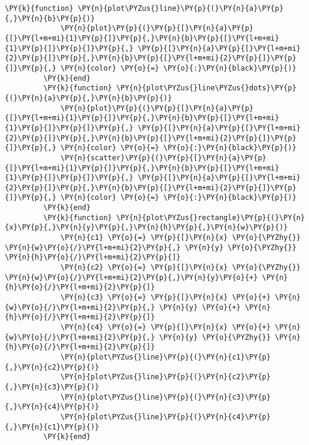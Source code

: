 \begin{Verbatim}[commandchars=\\\{\}]
         \PY{k}{function} \PY{n}{plot\PYZus{}line}\PY{p}{(}\PY{n}{a}\PY{p}{,}\PY{n}{b}\PY{p}{)}
             \PY{n}{plot}\PY{p}{(}\PY{p}{[}\PY{n}{a}\PY{p}{[}\PY{l+m+mi}{1}\PY{p}{]}\PY{p}{,}\PY{n}{b}\PY{p}{[}\PY{l+m+mi}{1}\PY{p}{]}\PY{p}{]}\PY{p}{,} \PY{p}{[}\PY{n}{a}\PY{p}{[}\PY{l+m+mi}{2}\PY{p}{]}\PY{p}{,}\PY{n}{b}\PY{p}{[}\PY{l+m+mi}{2}\PY{p}{]}\PY{p}{]}\PY{p}{,} \PY{n}{color} \PY{o}{=} \PY{o}{:}\PY{n}{black}\PY{p}{)}
         \PY{k}{end}
         \PY{k}{function} \PY{n}{plot\PYZus{}line\PYZus{}dots}\PY{p}{(}\PY{n}{a}\PY{p}{,}\PY{n}{b}\PY{p}{)}
             \PY{n}{plot}\PY{p}{(}\PY{p}{[}\PY{n}{a}\PY{p}{[}\PY{l+m+mi}{1}\PY{p}{]}\PY{p}{,}\PY{n}{b}\PY{p}{[}\PY{l+m+mi}{1}\PY{p}{]}\PY{p}{]}\PY{p}{,} \PY{p}{[}\PY{n}{a}\PY{p}{[}\PY{l+m+mi}{2}\PY{p}{]}\PY{p}{,}\PY{n}{b}\PY{p}{[}\PY{l+m+mi}{2}\PY{p}{]}\PY{p}{]}\PY{p}{,} \PY{n}{color} \PY{o}{=} \PY{o}{:}\PY{n}{black}\PY{p}{)}
             \PY{n}{scatter}\PY{p}{(}\PY{p}{[}\PY{n}{a}\PY{p}{[}\PY{l+m+mi}{1}\PY{p}{]}\PY{p}{,}\PY{n}{b}\PY{p}{[}\PY{l+m+mi}{1}\PY{p}{]}\PY{p}{]}\PY{p}{,} \PY{p}{[}\PY{n}{a}\PY{p}{[}\PY{l+m+mi}{2}\PY{p}{]}\PY{p}{,}\PY{n}{b}\PY{p}{[}\PY{l+m+mi}{2}\PY{p}{]}\PY{p}{]}\PY{p}{,} \PY{n}{color} \PY{o}{=} \PY{o}{:}\PY{n}{black}\PY{p}{)}
         \PY{k}{end}
         \PY{k}{function} \PY{n}{plot\PYZus{}rectangle}\PY{p}{(}\PY{n}{x}\PY{p}{,}\PY{n}{y}\PY{p}{,}\PY{n}{h}\PY{p}{,}\PY{n}{w}\PY{p}{)}
             \PY{n}{c1} \PY{o}{=} \PY{p}{[}\PY{n}{x} \PY{o}{\PYZhy{}} \PY{n}{w}\PY{o}{/}\PY{l+m+mi}{2}\PY{p}{,} \PY{n}{y} \PY{o}{\PYZhy{}} \PY{n}{h}\PY{o}{/}\PY{l+m+mi}{2}\PY{p}{]}
             \PY{n}{c2} \PY{o}{=} \PY{p}{[}\PY{n}{x} \PY{o}{\PYZhy{}} \PY{n}{w}\PY{o}{/}\PY{l+m+mi}{2}\PY{p}{,}\PY{n}{y}\PY{o}{+} \PY{n}{h}\PY{o}{/}\PY{l+m+mi}{2}\PY{p}{]}
             \PY{n}{c3} \PY{o}{=} \PY{p}{[}\PY{n}{x} \PY{o}{+} \PY{n}{w}\PY{o}{/}\PY{l+m+mi}{2}\PY{p}{,} \PY{n}{y} \PY{o}{+} \PY{n}{h}\PY{o}{/}\PY{l+m+mi}{2}\PY{p}{]}
             \PY{n}{c4} \PY{o}{=} \PY{p}{[}\PY{n}{x} \PY{o}{+} \PY{n}{w}\PY{o}{/}\PY{l+m+mi}{2}\PY{p}{,} \PY{n}{y} \PY{o}{\PYZhy{}} \PY{n}{h}\PY{o}{/}\PY{l+m+mi}{2}\PY{p}{]}
             \PY{n}{plot\PYZus{}line}\PY{p}{(}\PY{n}{c1}\PY{p}{,}\PY{n}{c2}\PY{p}{)}
             \PY{n}{plot\PYZus{}line}\PY{p}{(}\PY{n}{c2}\PY{p}{,}\PY{n}{c3}\PY{p}{)}
             \PY{n}{plot\PYZus{}line}\PY{p}{(}\PY{n}{c3}\PY{p}{,}\PY{n}{c4}\PY{p}{)}
             \PY{n}{plot\PYZus{}line}\PY{p}{(}\PY{n}{c4}\PY{p}{,}\PY{n}{c1}\PY{p}{)}
         \PY{k}{end}
\end{Verbatim}

